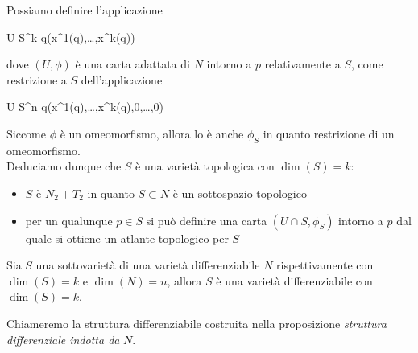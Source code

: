 Possiamo definire l'applicazione

	{U \cap S}{\R^{k}}
	{q}{(x^{1}(q),\dots,x^{k}(q))}

dove $ (U,\phi) $ è una carta adattata di $ N $ intorno a $ p $ relativamente a $ S $, come restrizione a $ S $ dell'applicazione

	{U \cap S}{\R^{n}}
	{q}{(x^{1}(q),\dots,x^{k}(q),0,\dots,0)}

Siccome $ \phi $ è un omeomorfismo, allora lo è anche $ \phi_{S} $ in quanto restrizione di un omeomorfismo.\\
Deduciamo dunque che $ S $ è una varietà topologica con $ \dim(S) = k $:

\begin{itemize}
	\item $ S $ è $ N_{2}+T_{2} $ in quanto $ S \subset N $ è un sottospazio topologico
	
	\item per un qualunque $ p \in S $ si può definire una carta $ (U \cap S,\phi_{S}) $ intorno a $ p $ dal quale si ottiene un atlante topologico per $ S $
\end{itemize}

\begin{definition}
	Sia $ S $ una sottovarietà di una varietà differenziabile $ N $ rispettivamente con $ \dim(S) = k $ e $ \dim(N) = n $, allora $ S $ è una varietà differenziabile con $ \dim(S) = k $.
\end{definition}

Chiameremo la struttura differenziabile costruita nella proposizione \textit{struttura differenziale indotta da} $ N $.

